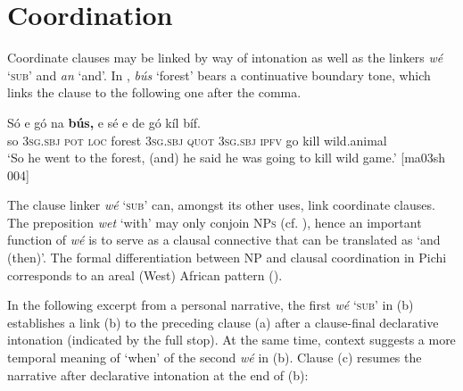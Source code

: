 \section{Coordination}\label{sec:10.3}

Coordinate clauses may be linked by way of intonation as well as the linkers \textit{wé} ‘\textsc{sub}’ and \textit{an} ‘and’. In , \textit{bús} ‘forest’ bears a continuative boundary tone, which links the clause to the following one after the comma.


\ea%
    \label{ex:key:1361}
    \gll Só  e    gó  na  \textbf{bús,}    e    sé    e    de
gó  kíl  bíf.\\
so  \textsc{3sg.sbj}  \textsc{pot}  \textsc{loc}  forest  \textsc{3sg.sbj}  \textsc{quot}    \textsc{3sg.sbj}  \textsc{ipfv}
go  kill  wild.animal\\

\glt ‘So he went to the forest, (and) he said he was going to kill
wild game.’ [ma03sh 004]
\z

The clause linker \textit{wé} ‘\textsc{sub}’ can, amongst its other uses, link coordinate clauses. The preposition \textit{wet} ‘with’ may only conjoin \textsc{NPs} (cf. ), hence an important function of \textit{wé} is to serve as a clausal connective that can be translated as ‘and (then)’. The formal differentiation between \textsc{NP} and clausal coordination in Pichi corresponds to an areal (West) African pattern (\citealt[349–353]{Mithun1988}). 


In the following excerpt from a personal narrative, the first \textit{wé} ‘\textsc{sub}’ in (b) establishes a link (b) to the preceding clause (a) after a clause-final declarative intonation (indicated by the full stop). At the same time, context suggests a more temporal meaning of ‘when’ of the second \textit{wé} in (b). Clause (c) resumes the narrative after declarative intonation at the end of (b): 



\ea%
    \label{ex:key:1362}
\z\z

